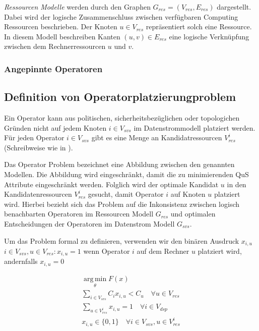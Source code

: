 \documentclass{article}
\begin{document}
\textit{Ressourcen Modelle} werden durch den Graphen $G_{res} = (V_{res}, E_{res})$ dargestellt. 
Dabei wird der logische Zusammenschluss zwischen verfügbaren Computing Ressourcen beschrieben. Der Knoten $u \in V_{res}$ 
repräsentiert solch eine Ressource. In diesem Modell beschreiben Kanten $(u,v) \in E_{res}$ 
eine logische Verknüpfung zwischen dem Rechnerressourcen $u$ und $v$.


\subsubsection{Angepinnte Operatoren}



\subsection{Definition von Operatorplatzierungproblem} \label{OPP-Definition}
Ein Operator kann aus politischen, sicherheitsbezüglichen oder topologichen Gründen \cite{cardellini-optimal_operatorplc} nicht auf jedem Knoten 
$i \in V_{svs}$ im Datenstrommodell platziert werden. 
Für jeden Operator $i \in V_{svs}$ gibt es eine Menge an Kandidatressourcen $V_{res}^i$ (Schreibweise wie in \cite{efficient-operator-placement}).

Das Operator Problem bezeichnet eine Abbildung zwischen den genannten Modellen. Die Abbildung wird eingeschränkt,
damit die zu minimierenden QuS Attribute eingeschränkt werden. Folglich wird der optimale Kandidat $u$ in den Kandidatenressourcen $V_{res}^i$
gesucht, damit Operator $i$ auf Knoten $u$ platziert wird.
Hierbei bezieht sich das Problem auf die Inkonsistenz zwischen 
logisch benachbarten Operatoren im Ressourcen Modell $G_{res}$ und optimalen Entscheidungen der Operatoren im Datenstrom Modell $G_{svs}$.

Um das Problem formal zu definieren, verwenden wir den binären Ausdruck $x_{i,u}$ $i \in V_{svs}, u \in V_{res}: x_{i,u} = 1$ wenn Operator $i$
auf dem Rechner $u$ platziert wird, andernfalls $x_{i,u} = 0$

\[ 
    \begin{gathered}
        \operatorname*{arg\,min}_\theta F(x) \\
        \sum_{i \in V_{svs}} C_i x_{i,u} < C_u \quad \forall u \in V_{res} \\ %
        \sum_{u \in V_{res}^i} x_{i,u} = 1 \quad \forall i \in V_{dsp} \\ %
        x_{i,u} \in \{0,1\} \quad \forall i \in V_{svs}, u \in V_{res}^i
    \end{gathered}
\] 
\end{document}
